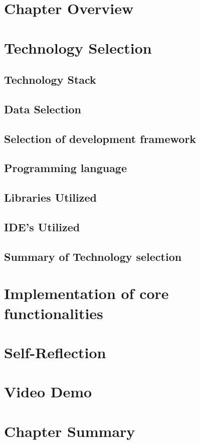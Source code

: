\section{Chapter Overview}



\section{Technology Selection}

\subsection{Technology Stack}


\subsection{Data Selection}


\subsection{Selection of development framework}


\subsection{Programming language}

\subsection{Libraries Utilized}

\subsection{IDE’s Utilized}

\subsection{Summary of Technology selection}



\section{Implementation of core functionalities}

\section{Self-Reflection}

\section{Video Demo}


\section{Chapter Summary}

